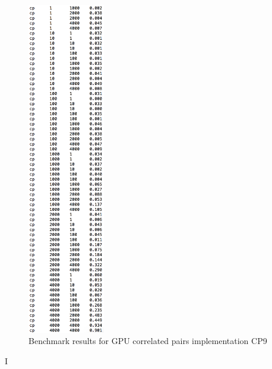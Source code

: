 \documentclass[a4paper,10pt]{article}
\begin{document}
\begin{figure}[H]
\centering
\includegraphics[width=0.3\textwidth]{figures/w5_benchmark}
\caption{Benchmark results for GPU correlated pairs implementation CP9}
\label{fig:pca_type}
\end{figure}







I
\end{document}
